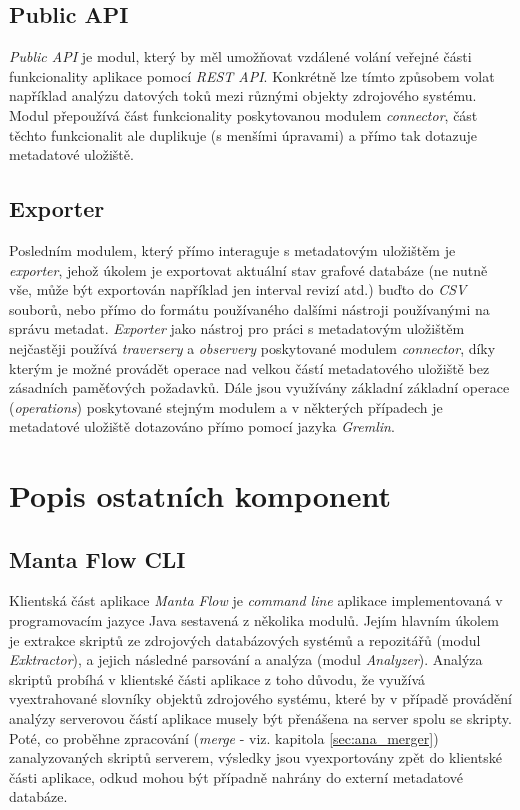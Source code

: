 \subsection{Public API}
\label{sec:ana_public}
\textit{Public API} je modul, který by měl umožňovat vzdálené volání veřejné části funkcionality aplikace pomocí \textit{REST API}. Konkrétně lze tímto způsobem volat například analýzu datových toků mezi různými objekty zdrojového systému. Modul přepoužívá část funkcionality poskytovanou modulem \textit{connector}, část těchto funkcionalit ale duplikuje (s menšími úpravami) a přímo tak dotazuje metadatové uložiště.

\subsection{Exporter}
\label{sec:ana_exporter}
Posledním modulem, který přímo interaguje s metadatovým uložištěm je \textit{exporter}, jehož úkolem je exportovat aktuální stav grafové databáze (ne nutně vše, může být exportován například jen interval revizí atd.) buďto do \textit{CSV} souborů, nebo přímo do formátu používaného dalšími nástroji používanými na správu metadat. \textit{Exporter} jako nástroj pro práci s metadatovým uložištěm nejčastěji používá \textit{traversery} a \textit{observery} poskytované modulem \textit{connector}, díky kterým je možné provádět operace nad velkou částí metadatového uložiště bez zásadních paměťových požadavků. Dále jsou využívány základní základní operace (\textit{operations}) poskytované stejným modulem a v některých případech je metadatové uložiště dotazováno přímo pomocí jazyka \textit{Gremlin}.


\section{Popis ostatních komponent}
\label{sec:ana_other}
\subsection{Manta Flow CLI}
Klientská část aplikace \textit{Manta Flow} je \textit{command line} aplikace implementovaná v programovacím jazyce Java sestavená z několika modulů. Jejím hlavním úkolem je extrakce skriptů ze zdrojových databázových systémů a repozitářů (modul \textit{Exktractor}), a jejich následné parsování a analýza (modul \textit{Analyzer}). Analýza skriptů probíhá v klientské části aplikace z toho důvodu, že využívá vyextrahované slovníky objektů zdrojového systému, které by v případě provádění analýzy serverovou částí aplikace musely být přenášena na server spolu se skripty. Poté, co proběhne zpracování (\textit{merge} - viz. kapitola \ref{sec:ana_merger}) zanalyzovaných skriptů serverem, výsledky jsou vyexportovány zpět do klientské části aplikace, odkud mohou být případně nahrány do externí metadatové databáze.

